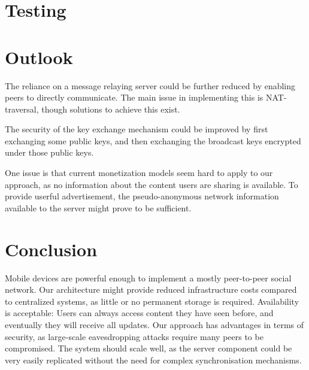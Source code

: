 \documentclass{report}
\begin{document}
\section{Testing}


\section{Outlook}

The reliance on a message relaying server could be further reduced by enabling peers to directly communicate. The main issue in implementing this is NAT-traversal, though solutions to achieve this exist.

The security of the key exchange mechanism could be improved by first exchanging some public keys, and then exchanging the broadcast keys encrypted under those public keys.

One issue is that current monetization models seem hard to apply to our approach, as no information about the content users are sharing is available. To provide userful advertisement, the pseudo-anonymous network information available to the server might prove to be sufficient. 

\section{Conclusion}

Mobile devices are powerful enough to implement a mostly peer-to-peer social network. Our architecture might provide reduced infrastructure costs compared to centralized systems, as little or no permanent storage is required. Availability is acceptable: Users can always access content they have seen before, and eventually they will receive all updates. Our approach has advantages in terms of security, as large-scale eavesdropping attacks require many peers to be compromised.
The system should scale well, as the server component could be very easily replicated without the need for complex synchronisation mechanisms.





\end{document}
